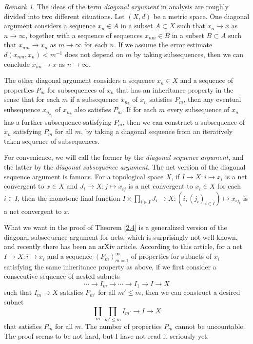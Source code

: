 \documentclass[noamsfonts,a4paper,10pt]{amsart}
\theoremstyle{plain}
\theoremstyle{definition}
\theoremstyle{remark}
\newtheorem{rmk}[thm]{Remark}
\begin{document}
\begin{rmk}
The ideas of the term \emph{diagonal argument} in analysis are roughly divided into two different situations.
Let $(X,d)$ be a metric space.
One diagonal argument considers a sequence $x_n\in A$ in a subset $A\subset X$ such that $x_n\to x$ as $n\to\infty$, together with a sequence of sequences $x_{nm}\in B$ in a subset $B\subset A$ such that $x_{nm}\to x_n$ as $m\to\infty$ for each $n$.
If we assume the error estimate $d(x_{nm},x_n)<m^{-1}$ does not depend on $m$ by taking subsequences, then we can conclude $x_{nn}\to x$ as $n\to\infty$.

The other diagonal argument considers a sequence $x_n\in X$ and a sequence of properties $P_m$ for subsequences of $x_n$ that has an inheritance property in the sense that for each $m$ if a subsequence $x_{n_k}$ of $x_n$ satisfies $P_m$, then any eventual subsequence $x_{n_{k_j}}$ of $x_{n_k}$ also satisfies $P_m$.
If for each $m$ every subsequence of $x_n$ has a further subsequence satisfying $P_m$, then we can construct a subsequence of $x_n$ satisfying $P_m$ for all $m$, by taking a diagonal sequence from an iteratively taken sequence of subsequences.

For convenience, we will call the former by the \emph{diagonal sequence argument}, and the latter by the \emph{diagonal subsequence argument}.
The net version of the diagonal sequence argument is famous.
For a topological space $X$, if $I\to X:i\mapsto x_i$ is a net convergent to $x\in X$ and $J_i\to X:j\mapsto x_{ij}$ is a net convergent to $x_i\in X$ for each $i\in I$, then the monotone final function $I\times\prod_{i\in I}J_i\to X:(i,(j_i)_{i\in I})\mapsto x_{ij_i}$ is a net convergent to $x$.

What we want in the proof of Theorem \ref{2.4} is a generalized version of the diagonal subsequence argument for nets, which is surprisingly not well-known, and recently there has been an arXiv article.
According to this article, for a net $I\to X:i\mapsto x_i$ and a sequence $(P_m)_{m=1}^\infty$ of properties for subnets of $x_i$ satisfying the same inheritance property as above, if we first consider a consecutive sequence of nested subnets
\[\cdots\to I_m\to\cdots\to I_1\to I\to X\]
such that $I_m\to X$ satisfies $P_{m'}$ for all $m'\le m$, then we can construct a desired subnet
\[\coprod_m\prod_{m'\le m}I_{m'}\to I\to X\]
that satisfies $P_m$ for all $m$.
The number of properties $P_m$ cannot be uncountable.
The proof seems to be not hard, but I have not read it seriously yet.
\end{rmk}
\end{document}
